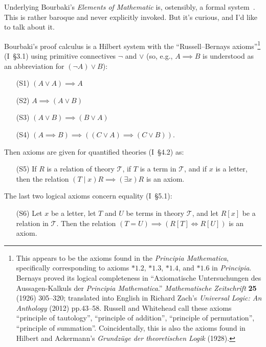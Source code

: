 \begin{node}\label{bourbaki-000C}%
Underlying Bourbaki's \textit{Elements of Mathematic} is, ostensibly, a
formal system~\cite[ch~I]{bourbaki1968theory}. This is rather baroque
and never explicitly invoked. But it's curious, and I'd like to talk
about it.
\end{node}

\begin{node}\label{bourbaki-000D}%
Bourbaki's proof calculus is a Hilbert system with the ``Russell--Bernays
axioms''\footnote{This appears to be the axioms found in the
\textit{Principia Mathematica}, specifically corresponding to axioms
$*1.2$, $*1.3$, $*1.4$, and $*1.6$ in \textit{Principia}. Bernays proved
its logical completeness in ``Axiomatische Untersuchungen des
Aussagen-Kalkuls der \textit{Principia Mathematica}.''
\textit{Mathematische Zeitschrift} \textbf{25} (1926) 305--320;
translated into English in Richard Zach's \textit{Universal Logic: An
  Anthology} (2012) pp.43--58. Russell and Whitehead call these axioms
``principle of tautology'', ``principle of addition'',
``principle of permutation'', ``principle of
summation''. Coincidentally, this is also the axioms found in Hilbert
and Ackermann's \textit{Grundz\"{u}ge der theoretischen Logik} (1928).}
(I~\S3.1) using primitive connectives $\neg$ and $\lor$ (so, e.g.,
$A\implies B$ is understood as an abbreviation for $(\neg A)\lor B$):
\begin{itemize}
\item[(S1)] $(A\lor A)\implies A$
\item[(S2)] $A\implies(A\lor B)$
\item[(S3)] $(A\lor B)\implies(B\lor A)$
\item[(S4)] $(A\implies B)\implies((C\lor A)\implies(C\lor B))$.
\end{itemize}
Then axioms are given for quantified theories (I~\S4.2) as:
\begin{itemize}
\item[(S5)] If $R$ is a relation of theory $\mathcal{T}$, if $T$ is a
  term in $\mathcal{T}$, and if $x$ is a letter, then the relation
  $(T\mid x)R\implies(\exists x)R$ is an axiom.
\end{itemize}
The last two logical axioms concern equality (I~\S5.1):
\begin{itemize}
\item[(S6)] Let $x$ be a letter, let $T$ and $U$ be terms in theory $\mathcal{T}$,
  and let $R[x]$ be a relation in $\mathcal{T}$. Then the relation
  $(T=U)\implies(R[T]\iff R[U])$ is an axiom.

\end{itemize}
\end{node}
